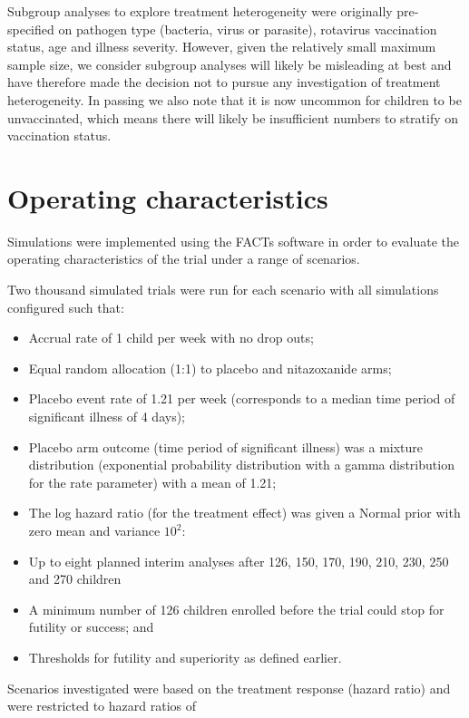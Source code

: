 \documentclass[a4paper]{article}
\begin{document}
Subgroup analyses to explore treatment heterogeneity were originally pre-specified on pathogen type (bacteria, virus or parasite), rotavirus vaccination status, age and illness severity.
However, given the relatively small maximum sample size, we consider subgroup analyses will likely be misleading at best and have therefore made the decision not to pursue any investigation of treatment heterogeneity.
In passing we also note that it is now uncommon for children to be unvaccinated, which means there will likely be insufficient numbers to stratify on vaccination status.

\section{Operating characteristics}

Simulations were implemented using the FACTs software \cite{facts} in order to evaluate the operating characteristics of the trial under a range of scenarios.

Two thousand simulated trials were run for each scenario with all simulations configured such that:

\begin{itemize}
    \item Accrual rate of 1 child per week with no drop outs;
    \item Equal random allocation (1:1) to placebo and nitazoxanide arms;
    \item Placebo event rate of 1.21 per week (corresponds to a median time period of significant illness of 4 days);
    \item Placebo arm outcome (time period of significant illness) was a mixture distribution (exponential probability distribution with a gamma distribution for the rate parameter) with a mean of 1.21;
    \item The log hazard ratio (for the treatment effect) was given a Normal prior with zero mean and variance $10^2$: 
    \item Up to eight planned interim analyses after 126, 150, 170, 190, 210, 230, 250 and 270 children 
    \item A minimum number of 126 children enrolled before the trial could stop for futility or success; and 
    \item Thresholds for futility and superiority as defined earlier.
\end{itemize}

Scenarios investigated were based on the treatment response (hazard ratio) and were restricted to hazard ratios of
\end{document}
